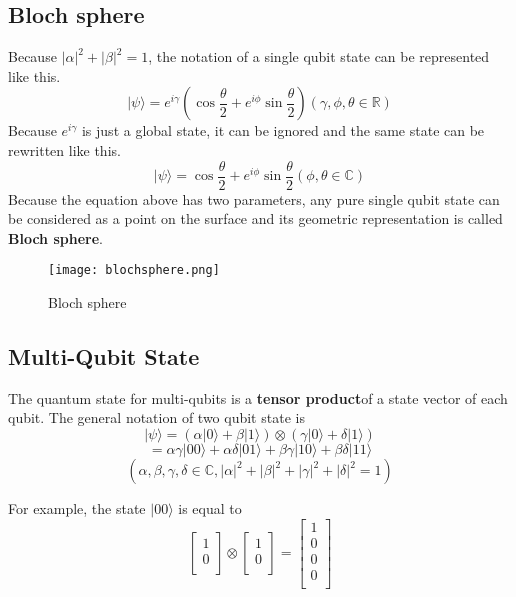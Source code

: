  \subsection{Bloch sphere}
 	Because $|\alpha|^2 + |\beta|^2 = 1$, the notation of a single qubit state can be represented like this.
	$$ |\psi\rangle = e^{i\gamma} (\cos{\frac{\theta}{2}} + e^{i\phi} \sin{\frac{\theta}{2}}) (\gamma, \phi, \theta \in \mathbb{R})$$ 
	Because $e^{i\gamma}$ is just a global state, it can be ignored and the same state can be rewritten like this.
	$$ |\psi\rangle =  \cos{\frac{\theta}{2}} + e^{i\phi} \sin{\frac{\theta}{2}} (\phi, \theta \in \mathbb{C})$$ 
	Because the equation above has two parameters,  any pure single qubit state can be considered as a point on the surface and its geometric representation is called \textbf{Bloch sphere}.
	\begin{figure}[h]
		\begin{center}
		\texttt{[image: blochsphere.png]}
		\end{center}
		\caption{Bloch sphere}
	\end{figure}
	
 \subsection{Multi-Qubit State}
  The quantum state for multi-qubits is a \textbf{tensor product}of a state vector of each qubit.  The general notation of two qubit state is
   $$ |\psi\rangle = (\alpha |0\rangle + \beta |1\rangle) \otimes  (\gamma |0\rangle + \delta |1\rangle) $$
   $$ = \alpha \gamma |00\rangle + \alpha \delta |01\rangle + \beta \gamma |10\rangle + \beta \delta |11\rangle $$
  $$(\alpha, \beta, \gamma, \delta \in \mathbb{C}, |\alpha|^2+|\beta|^2+|\gamma|^2+|\delta|^2=1)$$
  
  For example, the state $|00\rangle$ is equal to 
  $$  \left[
\begin{array}{c}
1 \\
0 \\
\end{array}
\right]
\otimes
 \left[
\begin{array}{c}
1 \\
0 \\
\end{array}
\right]
= \left[
\begin{array}{c}
1 \\
0 \\
0 \\
0 \\
\end{array}
\right]$$

